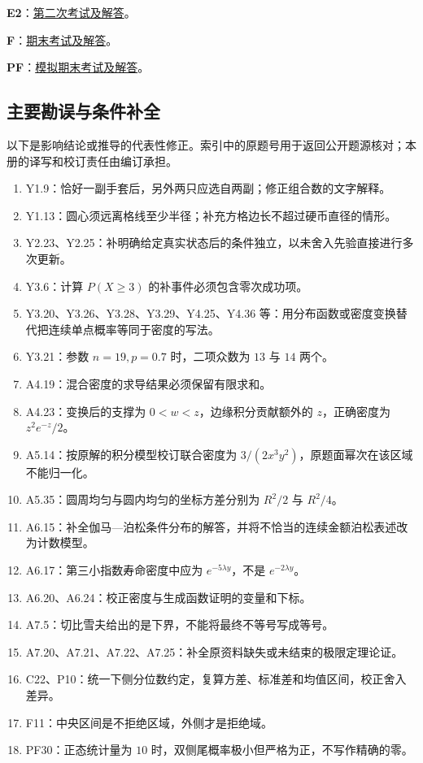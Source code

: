 \documentclass[UTF8,12pt,a4paper,fontset=fandol]{ctexart}
\begin{document}
\noindent\textbf{E2}：\href{https://ocw.mit.edu/courses/18-05-introduction-to-probability-and-statistics-spring-2022/mit18_05_s22_exam02_sol.pdf}{第二次考试及解答}。\par

\noindent\textbf{F}：\href{https://ocw.mit.edu/courses/18-05-introduction-to-probability-and-statistics-spring-2022/mit18_05_s22_exam_final_sol.pdf}{期末考试及解答}。\par

\noindent\textbf{PF}：\href{https://ocw.mit.edu/courses/18-05-introduction-to-probability-and-statistics-spring-2022/mit18_05_s22_prac_exam_final_sol.pdf}{模拟期末考试及解答}。\par

\subsection*{主要勘误与条件补全}
以下是影响结论或推导的代表性修正。索引中的原题号用于返回公开题源核对；本册的译写和校订责任由编订承担。
\begin{enumerate}
\item Y1.9：恰好一副手套后，另外两只应选自两副；修正组合数的文字解释。
\item Y1.13：圆心须远离格线至少半径；补充方格边长不超过硬币直径的情形。
\item Y2.23、Y2.25：补明确给定真实状态后的条件独立，以未舍入先验直接进行多次更新。
\item Y3.6：计算 $P(X\ge3)$ 的补事件必须包含零次成功项。
\item Y3.20、Y3.26、Y3.28、Y3.29、Y4.25、Y4.36 等：用分布函数或密度变换替代把连续单点概率等同于密度的写法。
\item Y3.21：参数 $n=19,p=0.7$ 时，二项众数为 $13$ 与 $14$ 两个。
\item A4.19：混合密度的求导结果必须保留有限求和。
\item A4.23：变换后的支撑为 $0<w<z$，边缘积分贡献额外的 $z$，正确密度为 $z^2e^{-z}/2$。
\item A5.14：按原解的积分模型校订联合密度为 $3/(2x^3y^2)$，原题面幂次在该区域不能归一化。
\item A5.35：圆周均匀与圆内均匀的坐标方差分别为 $R^2/2$ 与 $R^2/4$。
\item A6.15：补全伽马—泊松条件分布的解答，并将不恰当的连续金额泊松表述改为计数模型。
\item A6.17：第三小指数寿命密度中应为 $e^{-5\lambda y}$，不是 $e^{-2\lambda y}$。
\item A6.20、A6.24：校正密度与生成函数证明的变量和下标。
\item A7.5：切比雪夫给出的是下界，不能将最终不等号写成等号。
\item A7.20、A7.21、A7.22、A7.25：补全原资料缺失或未结束的极限定理论证。
\item C22、P10：统一下侧分位数约定，复算方差、标准差和均值区间，校正舍入差异。
\item F11：中央区间是不拒绝区域，外侧才是拒绝域。
\item PF30：正态统计量为 $10$ 时，双侧尾概率极小但严格为正，不写作精确的零。
\end{enumerate}
\end{document}
